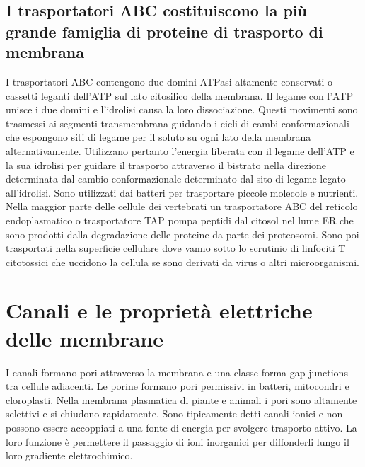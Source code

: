 \subsection{I trasportatori ABC costituiscono la pi\`u grande famiglia di proteine di trasporto di membrana}
I trasportatori ABC contengono due domini ATPasi altamente conservati o cassetti leganti dell'ATP sul lato citosilico della membrana. Il legame con l'ATP unisce i due domini e l'idrolisi
causa la loro dissociazione. Questi movimenti sono trasmessi ai segmenti transmembrana guidando i cicli di cambi conformazionali che espongono siti di legame per il soluto su ogni lato
della membrana alternativamente. Utilizzano pertanto l'energia liberata con il legame dell'ATP e la sua idrolisi per guidare il trasporto attraverso il bistrato nella direzione 
determinata dal cambio conformazionale determinato dal sito di legame legato all'idrolisi. Sono utilizzati dai batteri per trasportare piccole molecole e nutrienti. Nella maggior parte
delle cellule dei vertebrati un trasportatore ABC del reticolo endoplasmatico o trasportatore TAP pompa peptidi dal citosol nel lume ER che sono prodotti dalla degradazione delle 
proteine da parte dei proteosomi. Sono poi trasportati nella superficie cellulare dove vanno sotto lo scrutinio di linfociti T citotossici che uccidono la cellula se sono derivati da
virus o altri microorganismi. 
\section{Canali e le propriet\`a elettriche delle membrane}
I canali formano pori attraverso la membrana e una classe forma gap junctions tra cellule adiacenti. Le porine formano pori permissivi in batteri, mitocondri e cloroplasti. Nella
membrana plasmatica di piante e animali i pori sono altamente selettivi e si chiudono rapidamente. Sono tipicamente detti canali ionici e non possono essere accoppiati a una fonte di 
energia per svolgere trasporto attivo. La loro funzione \`e permettere il passaggio di ioni inorganici per diffonderli lungo il loro gradiente elettrochimico. 
